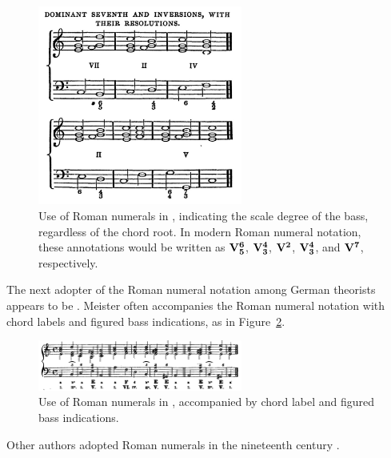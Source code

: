 \begin{figure}[h!]
    \centering
    \includegraphics[width=0.6\textwidth]{figures/chapter/2/primary_sources/hamilton1840cathecism044.png}
    \caption{Use of Roman numerals in \textcite{hamilton1840catechism}, indicating the scale degree of the bass, regardless of the chord root. In modern Roman numeral notation, these annotations would be written as $\textbf{V}\relax\relax{\footnotesize {}^\textbf{6}\relax_\textbf{5}\relax\relax}$, $\textbf{V}\relax\relax{\footnotesize {}^\textbf{4}\relax_\textbf{3}\relax\relax}$, $\textbf{V}\relax\relax{\footnotesize {}^\textbf{2}\relax\relax}$, $\textbf{V}\relax\relax{\footnotesize {}^\textbf{4}\relax_\textbf{3}\relax\relax}$, and $\textbf{V}\relax\relax{\footnotesize {}^\textbf{7}\relax\relax}$, respectively.}
    \label{fig:hamilton1840cathecism044}
\end{figure}

The next adopter of the Roman numeral notation among German theorists appears to be \textcite{meister1852vollstandige}.
Meister often accompanies the Roman numeral notation with chord labels and figured bass indications, as in Figure~\ref{fig:meister1852vollstandige32}.

\begin{figure}[h!]
    \centering
    \includegraphics[width=0.6\textwidth]{figures/chapter/2/primary_sources/meister1852vollstandige32.png}
    \caption{Use of Roman numerals in \textcite{meister1852vollstandige}, accompanied by chord label and figured bass indications.}
    \label{fig:meister1852vollstandige32}
\end{figure}

Other authors adopted Roman numerals in the nineteenth century \parencite{sechter1853grundsatze, richter1860lehrbuch, tiersch1874elementarbuch, tracy1878theory}.

